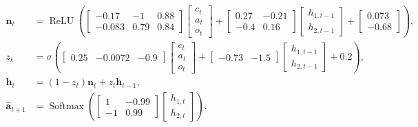 \begin{align*}
\mathbf{n}_t &= \operatorname{ReLU}\!\left(\begin{bmatrix}-0.17 & -1 & 0.88 \\ -0.083 & 0.79 & 0.84\end{bmatrix}\begin{bmatrix}c_t \\ a_t \\ o_t\end{bmatrix} + \begin{bmatrix}0.27 & -0.21 \\ -0.4 & 0.16\end{bmatrix}\begin{bmatrix}h_{1,t-1} \\ h_{2,t-1}\end{bmatrix} + \begin{bmatrix}0.073 \\ -0.68\end{bmatrix}\right), \\
z_t &= \sigma\!\left(\begin{bmatrix}0.25 & -0.0072 & -0.9\end{bmatrix}\begin{bmatrix}c_t \\ a_t \\ o_t\end{bmatrix} + \begin{bmatrix}-0.73 & -1.5\end{bmatrix}\begin{bmatrix}h_{1,t-1} \\ h_{2,t-1}\end{bmatrix} + 0.2\right), \\
\mathbf{h}_t &= (1-z_t)\mathbf{n}_t + z_t\mathbf{h}_{t-1}, \\
\hat{\mathbf{a}}_{t+1} &= \operatorname{Softmax}\!\left(\begin{bmatrix}1 & -0.99 \\ -1 & 0.99\end{bmatrix}\begin{bmatrix}h_{1,t} \\ h_{2,t}\end{bmatrix}\right).
\end{align*}
